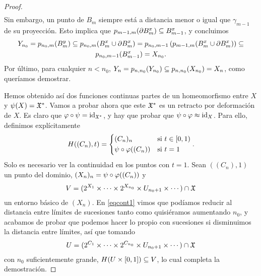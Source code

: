\begin{proof}
\begin{gather*}
  \end{gather*}
  Sin embargo, un punto de $ B_m  $ siempre está a distancia menor o igual que $ \gamma_{m-1}  $ de su proyección. Esto implica que $ p_{m-1,m}(\partial B_m^x)\subseteq B^x_{m-1}  $, y concluimos 
  \begin{gather*}
    Y_{n_0} = p_{n_0,m}(B^y_m)\subseteq p_{n_0,m}(B^x_m\cup \partial B_m^x) =  p_{n_0,m-1}\left(p_{m-1,m}(B^x_m\cup \partial B_m^x )\right)\subseteq \\ 
     p_{n_0,m-1}(B_{m-1}^x) = X_{n_0}.
  \end{gather*}
  Por último, para cualquier $ n<n_0  $, $ Y_{n } = p_{n,n_0}(Y_{n_0})\subseteq p_{n,n_0}(X_{n_0}) = X_n$, como queríamos demostrar.

  Hemos obtenido así dos funciones continuas partes de un homeomorfismo entre $ X  $ y $ \psi(X) = \mathfrak{X}^*  $. Vamos a probar ahora que este $ \mathfrak{X}^*  $ es un retracto por deformación de $ X  $. Es claro que $ \varphi\circ \psi  = \operatorname{id}_{\mathfrak{X}^* } $, y hay que probar que $ \psi\circ \varphi \approx \operatorname{id}_{X } $. Para ello, definimos explícitamente 
  \begin{gather*}
    H((C_n),t) = \begin{dcases}
      (C_n)_n & \text{si } t\in [0,1)\\ 
      \psi\circ \varphi((C_n)) & \text{si } t=1 
    \end{dcases}.
  \end{gather*}
  Solo es necesario ver la continuidad en los puntos con $ t=1  $. Sean $ ((C_n),1)$ un punto del dominio, $ (X_n)_n = \psi\circ \varphi ((C_n)) $ y 
  \begin{gather*}
    V = (2^{X_1}\times\cdots\times 2^{X_{n_0}}\times U_{n_0+1}\times\cdots)\cap\mathfrak{X} 
  \end{gather*}
  un entorno básico de $ (X_n ) $. En \eqref{eqcont1} vimos que podíamos reducir al distancia entre límites de sucesiones tanto como quisiéramos aumentando $ n_0  $, y acabamos de probar que podemos hacer lo propio con sucesiones si disminuimos la distancia entre límites, así que tomando 
  \begin{gather*}
    U = (2^{C_1}\times\cdots\times 2^{C_{n_0}}\times U_{n_0+1}\times\cdots)\cap\mathfrak{X}
  \end{gather*}
  con $ n_0  $ suficientemente grande, $ H(U\times [0,1])\subseteq V   $, lo cual completa la demostración.
\end{proof}

